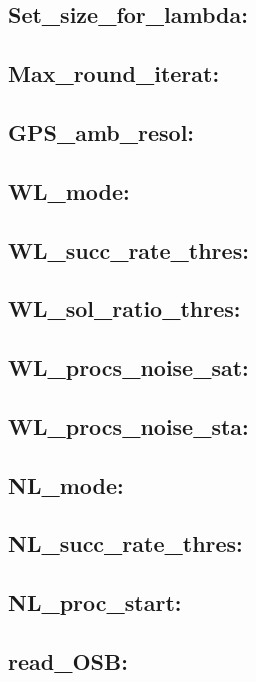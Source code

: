 \subsection{Set\_size\_for\_lambda:}

\subsection{Max\_round\_iterat:}

\subsection{GPS\_amb\_resol:}

\subsection{WL\_mode:}

\subsection{WL\_succ\_rate\_thres:}

\subsection{WL\_sol\_ratio\_thres:}

\subsection{WL\_procs\_noise\_sat:}

\subsection{WL\_procs\_noise\_sta:}

\subsection{NL\_mode:}

\subsection{NL\_succ\_rate\_thres:}

\subsection{NL\_proc\_start:}

\subsection{read\_OSB:}

